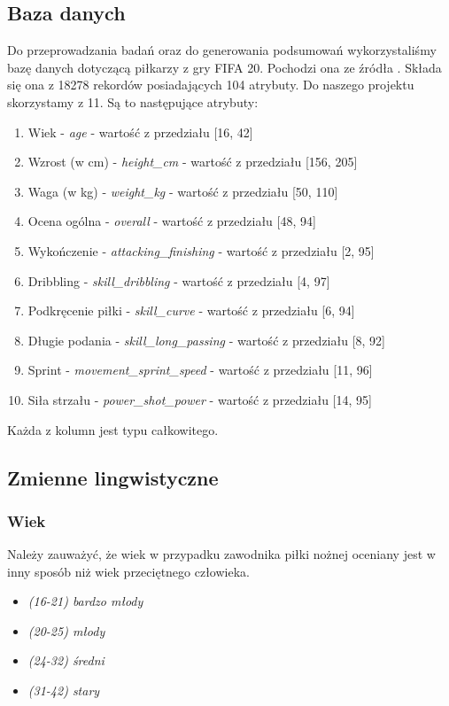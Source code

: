 \documentclass{classrep}
\begin{document}
	\subsection{Baza danych}
	Do przeprowadzania badań oraz do generowania podsumowań wykorzystaliśmy bazę danych dotyczącą piłkarzy z gry FIFA 20. Pochodzi ona ze źródła \cite{baza}. Składa się ona z 18278 rekordów posiadających 104 atrybuty. Do naszego projektu skorzystamy z 11. Są to następujące atrybuty:
	
	\begin{enumerate}
		\item Wiek - \textsl{age} - wartość z przedziału [16, 42]
		\item Wzrost (w cm) - \textsl{height\_cm} - wartość z przedziału [156, 205]
		\item Waga (w kg) - \textsl{weight\_kg} - wartość z przedziału [50, 110]
		\item Ocena ogólna - \textsl{overall} - wartość z przedziału [48, 94]
		\item Wykończenie - \textsl{attacking\_finishing} - wartość z przedziału [2, 95]
		\item Dribbling - \textsl{skill\_dribbling} - wartość z przedziału [4, 97]
		\item Podkręcenie piłki - \textsl{skill\_curve} - wartość z przedziału [6, 94]
		\item Długie podania - \textsl{skill\_long\_passing} - wartość z przedziału [8, 92]
		\item Sprint - \textsl{movement\_sprint\_speed} - wartość z przedziału [11, 96]
		\item Siła strzału - \textsl{power\_shot\_power} - wartość z przedziału [14, 95]
	\end{enumerate}

	Każda z kolumn jest typu całkowitego.

	\subsection{Zmienne lingwistyczne}
	\subsubsection{Wiek}
	Należy zauważyć, że wiek w przypadku zawodnika piłki nożnej oceniany jest w inny sposób niż wiek przeciętnego człowieka.
	\begin{itemize}
		\item \textsl{(16-21) bardzo młody}
		\item \textsl{(20-25) młody}
		\item \textsl{(24-32) średni}
		\item \textsl{(31-42) stary}
	\end{itemize}
	
\end{document}
